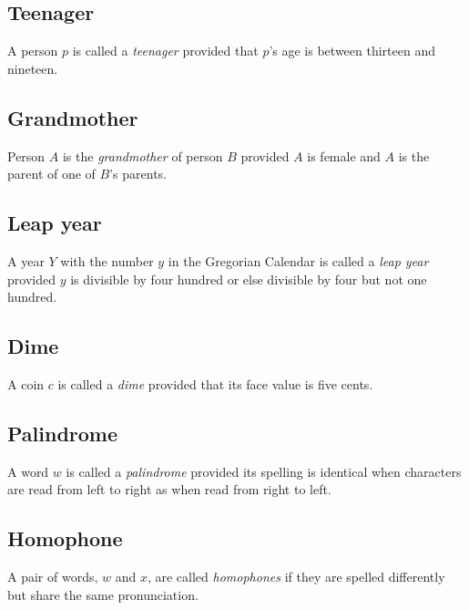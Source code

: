 \documentclass[12pt]{article}
\begin{document}
\subsection{Teenager}
A person $p$ is called a \textit{teenager} provided that $p$'s age is between thirteen and nineteen.
\subsection{Grandmother}
Person $A$ is the \textit{grandmother} of person $B$ provided $A$ is female and $A$ is the parent of one of $B$'s parents.
\subsection{Leap year}
A year $Y$ with the number $y$ in the Gregorian Calendar is called a \textit{leap year} provided $y$ is divisible by four hundred or else divisible by four but not one hundred.
\subsection{Dime}
A coin $c$ is called a \textit{dime} provided that its face value is five cents.
\subsection{Palindrome}
A word $w$ is called a \textit{palindrome} provided its spelling is identical when characters are read from left to right as when read from right to left.
\subsection{Homophone}
A pair of words, $w$ and $x$, are called \textit{homophones} if they are spelled differently but share the same pronunciation.
\end{document}
